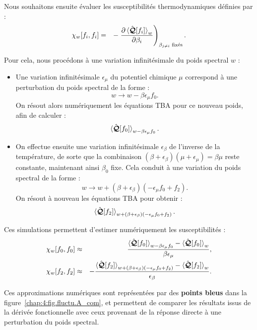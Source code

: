 \medskip

Nous souhaitons ensuite évaluer les susceptibilités thermodynamiques définies par :
\begin{eqnarray}
	\chi_w[f_i, f_i] & = & - \left. \frac{\partial \braket{\hat{\bm{\mathcal{Q}}}[f_i]}_w}{\partial \beta_i} \right)_{\beta_{j \neq i} \text{ fixés}}.
\end{eqnarray}

Pour cela, nous procédons à une variation infinitésimale du poids spectral $w$ :

\begin{itemize}[label =$\bullet$]
	\item Une variation infinitésimale $\epsilon_\mu$ du potentiel chimique $\mu$ correspond à une perturbation du poids spectral de la forme :
	\[
	w \rightarrow w - \beta \epsilon_\mu f_0.
	\]
	On résout alors numériquement les équations \gls{TBA} pour ce nouveau poids, afin de calculer :
	\[
	\braket{\hat{\bm{\mathcal{Q}}}[f_0]}_{w - \beta \epsilon_\mu f_0}.
	\]

	\item On effectue ensuite une variation infinitésimale $\epsilon_\beta$ de l’inverse de la température, de sorte que la combinaison \( (\beta + \epsilon_\beta)(\mu + \epsilon_\mu) = \beta \mu \) reste constante, maintenant ainsi $\beta_0$ fixe. Cela conduit à une variation du poids spectral de la forme :
	\[
	w \rightarrow w + (\beta + \epsilon_\beta)(- \epsilon_\mu f_0 + f_2).
	\]
	On résout à nouveau les équations TBA pour obtenir :
	\[
	\braket{\hat{\bm{\mathcal{Q}}}[f_2]}_{w + (\beta + \epsilon_\beta)(- \epsilon_\mu f_0 + f_2)}.
	\]
\end{itemize}

\medskip

Ces simulations permettent d’estimer numériquement les susceptibilités :
\begin{eqnarray}
	\chi_w[f_0, f_0]	 & \approx & \frac{\braket{\hat{\bm{\mathcal{Q}}}[f_0]}_{w - \beta \epsilon_\mu f_0} - \braket{\hat{\bm{\mathcal{Q}}}[f_0]}_w}{\beta \epsilon_\mu},	\\
	\chi_w[f_2, f_2]	 & \approx & - \frac{\braket{\hat{\bm{\mathcal{Q}}}[f_2]}_{w + (\beta + \epsilon_\beta)(- \epsilon_\mu f_0 + f_2)} - \braket{\hat{\bm{\mathcal{Q}}}[f_2]}_w}{\epsilon_\beta}.
\end{eqnarray}

\medskip

Ces approximations numériques sont représentées par des {\bf points bleus} dans la figure~\eqref{chap:4:fig.fluctu.A_com}, et permettent de comparer les résultats issus de la dérivée fonctionnelle avec ceux provenant de la réponse directe à une perturbation du poids spectral.



